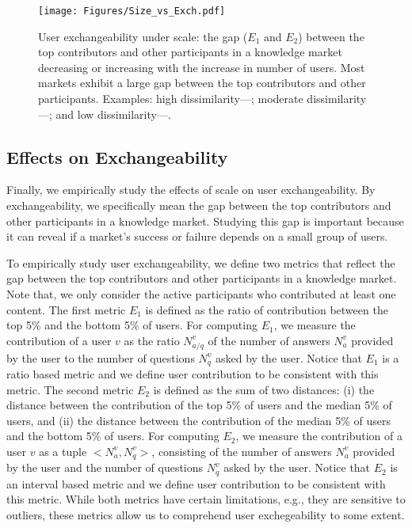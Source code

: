 \begin{figure}[b]
\centering
\texttt{[image: Figures/Size\_vs\_Exch.pdf]}
\caption{User exchangeability under scale: the gap ($E_1$ and $E_2$) between the top contributors and other participants in a knowledge market decreasing or increasing with the increase in number of users. Most markets exhibit a large gap between the top contributors and other participants. Examples: high dissimilarity---; moderate dissimilarity---; and low dissimilarity---.}
\label{fig:stability}
\end{figure}

\subsection{Effects on Exchangeability}
Finally, we empirically study the effects of scale on user exchangeability. By exchangeability, we specifically mean the gap between the top contributors and other participants in a knowledge market. Studying this gap is important because it can reveal if a market's success or failure depends on a small group of users.  

To empirically study user exchangeability, we define two metrics that reflect the gap between the top contributors and other participants in a knowledge market. Note that, we only consider the active participants who contributed at least one content. The first metric $E_1$ is defined as the ratio of contribution between the top 5\% and the bottom 5\% of users. For computing $E_1$, we measure the contribution of a user $v$ as the ratio $N^v_{a/q}$ of the number of answers $N^v_{a}$ provided by the user to the number of questions $N^v_{q}$ asked by the user. Notice that $E_1$ is a ratio based metric and we define user contribution to be consistent with this metric. The second metric $E_2$ is defined as the sum of two distances: (i) the distance between the contribution of the top 5\% of users and the median 5\% of users, and (ii) the distance between the contribution of the median 5\% of users and the bottom 5\% of users. For computing $E_2$, we measure the contribution of a user $v$ as a tuple $<N^v_a, N^v_q>$, consisting of the number of answers $N^v_{a}$ provided by the user and the number of questions $N^v_{q}$ asked by the user. Notice that $E_2$ is an interval based metric and we define user contribution to be consistent with this metric. While both metrics have certain limitations, e.g., they are sensitive to outliers, these metrics allow us to comprehend user exchegeability to some extent.

